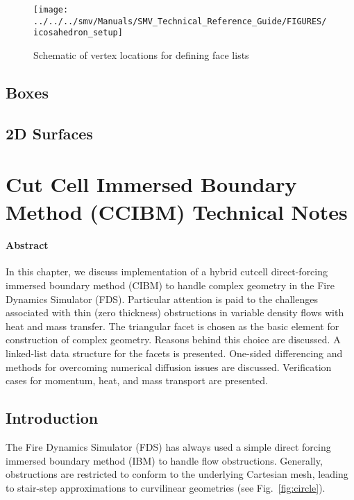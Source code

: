 \documentclass[12pt]{article}
\begin{document}
\begin{figure}
\begin{center}
\texttt{[image: ../../../smv/Manuals/SMV\_Technical\_Reference\_Guide/FIGURES/icosahedron\_setup]}
\end{center}
\caption{Schematic of vertex locations for defining face lists}
\label{figure:facelist}
\end{figure}

\subsection{Boxes}
\subsection{2D Surfaces}


\clearpage

\section{Cut Cell Immersed Boundary Method (CCIBM) Technical Notes}

\paragraph{Abstract} In this chapter, we discuss implementation of a hybrid cutcell direct-forcing immersed boundary method (CIBM) to handle complex geometry in the Fire Dynamics Simulator (FDS).  Particular attention is paid to the challenges associated with thin (zero thickness) obstructions in variable density flows with heat and mass transfer.  The triangular facet is chosen as the basic element for construction of complex geometry.  Reasons behind this choice are discussed.  A linked-list data structure for the facets is presented.  One-sided differencing and methods for overcoming numerical diffusion issues are discussed.  Verification cases for momentum, heat, and mass transport are presented.

\subsection{Introduction}

The Fire Dynamics Simulator (FDS) has always used a simple direct forcing immersed boundary method (IBM) to handle flow obstructions.  Generally, obstructions are restricted to conform to the underlying Cartesian mesh, leading to stair-step approximations to curvilinear geometries (see Fig.~\ref{fig:circle}).
\end{document}
